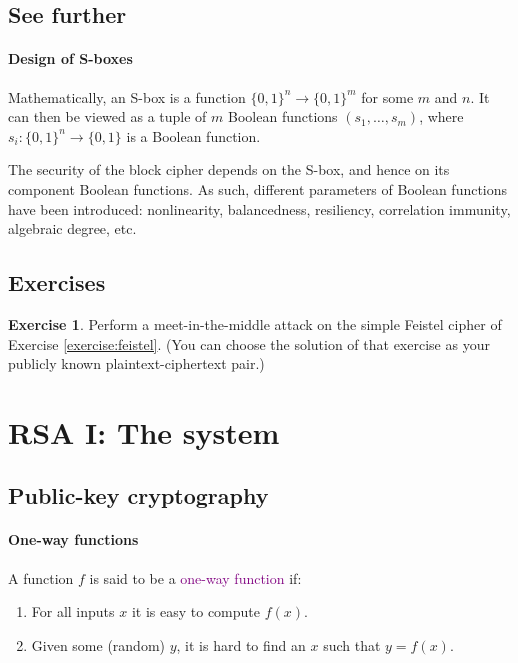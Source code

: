 \documentclass[a4paper, 11pt, openany]{book}
\numberwithin{equation}{section}
\theoremstyle{plain}
\theoremstyle{definition}
\newtheorem{exercise}   {Exercise}  [section]
\newcommand{\Define}[1]{\textcolor{purple}{#1}}
\begin{document}
\subsection{See further}

\paragraph{Design of S-boxes}
Mathematically, an S-box is a function $\{0,1\}^n \to \{0,1\}^m$ for some $m$ and $n$. It can then be viewed as a tuple of $m$ Boolean functions $(s_1, \dots, s_m)$, where $s_i : \{0,1\}^n \to \{0,1\}$ is a Boolean function.

The security of the block cipher depends on the S-box, and hence on its component Boolean functions. As such, different parameters of Boolean functions have been introduced: nonlinearity, balancedness, resiliency, correlation immunity, algebraic degree, etc.





\subsection{Exercises}

\begin{exercise}
Perform a meet-in-the-middle attack on the simple Feistel cipher of Exercise \ref{exercise:feistel}. (You can choose the solution of that exercise as your publicly known plaintext-ciphertext pair.)
\end{exercise}






\section{RSA I: The system}
\label{sec:14}


\subsection{Public-key cryptography}

\paragraph{One-way functions}
A function $f$ is said to be a \Define{one-way function} if:
\begin{enumerate}
    \item For all inputs $x$ it is easy to compute $f(x)$.

    \item Given some (random) $y$, it is hard to find an $x$ such that $y = f(x)$. 
\end{enumerate}
\end{document}
